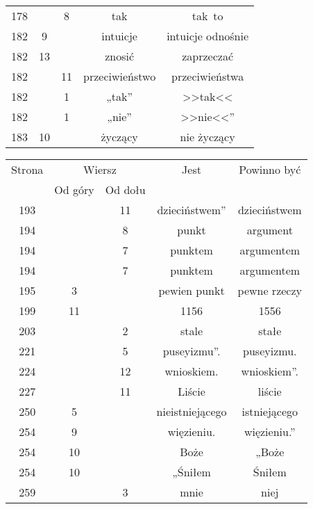\documentclass[a4paper,11pt]{article}
\begin{document}
\begin{center}
\begin{tabular}{|c|c|c|c|c|}
    178 & & \hphantom{0}8 & tak & tak~to \\
    182 & \hphantom{0}9 & & intuicje & intuicje odnośnie \\
    182 & 13 & & znosić & zaprzeczać \\
    182 & & 11 & przeciwieństwo & przeciwieństwa \\
    182 & & \hphantom{0}1 & „tak” & >>tak<<  %
    \\
    182 & & \hphantom{0}1 & „nie” & >>nie<<”  %
    \\
    183 & 10 & & życzący & nie życzący \\
    \hline
  \end{tabular}





  \newpage

  \begin{tabular}{|c|c|c|c|c|}
    \hline
    Strona & \multicolumn{2}{c|}{Wiersz} & Jest
                              & Powinno być \\ \cline{2-3}
    & Od góry & Od dołu & & \\
    \hline
    193 & & 11 & dzieciństwem” & dzieciństwem \\
    194 & & \hphantom{0}8 & punkt & argument \\
    194 & & \hphantom{0}7 & punktem & argumentem \\
    194 & & \hphantom{0}7 & punktem & argumentem \\
    195 & \hphantom{0}3 & & pewien punkt & pewne rzeczy \\
    199 & 11 & & 1156 & 1556 \\
    203 & & \hphantom{0}2 & stale & stałe \\
    221 & & \hphantom{0}5 & puseyizmu”. & puseyizmu. \\
    224 & & 12 & wnioskiem. & wnioskiem”. \\
    227 & & 11 & Liście & liście \\
    250 & \hphantom{0}5 & & nieistniejącego & istniejącego \\
    254 & \hphantom{0}9 & & więzieniu. & więzieniu.” \\
    254 & 10 & & Boże & „Boże \\
    254 & 10 & & „Śniłem & Śniłem \\
    259 & & \hphantom{0}3 & mnie & niej \\
    \hline
  \end{tabular}


\end{center}
\end{document}
